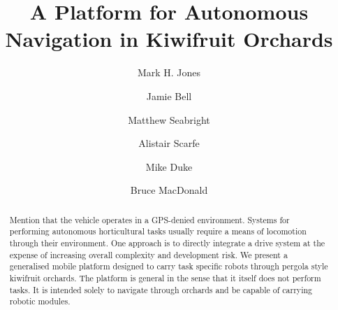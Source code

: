 \documentclass[preprint,authoryear,12pt]{elsarticle}
\begin{document}
\begin{frontmatter}



\title{A Platform for Autonomous Navigation in Kiwifruit Orchards}



\author[UoW]{Mark H. Jones}

\author[UoA]{Jamie Bell}
\author[UoW]{Matthew Seabright}
\author[RPL]{Alistair Scarfe}
\author[UoW]{Mike Duke}
\author[UoA]{Bruce MacDonald}

\address[UoW]{School of Engineering, University of Waikato, Hamilton, New Zealand}
\address[UoA]{Faculty of Engineering, University of Auckland, Auckland, New Zealand}
\address[RPL]{Robotics Plus Ltd, Newnham Innovation Park, Tauranga, New Zealand}


\begin{abstract}
    \color{red}Mention that the vehicle operates in a GPS-denied environment\color{black}.
    Systems for performing autonomous horticultural tasks usually require a means of locomotion through their environment.
    One approach is to directly integrate a drive system at the expense of increasing overall complexity and development risk.
    We present a generalised mobile platform designed to carry task specific robots through pergola style kiwifruit orchards.
    The platform is general in the sense that it itself does not perform tasks.
    It is intended solely to navigate through orchards and be capable of carrying robotic modules.


\end{abstract}
\end{frontmatter}
\end{document}
